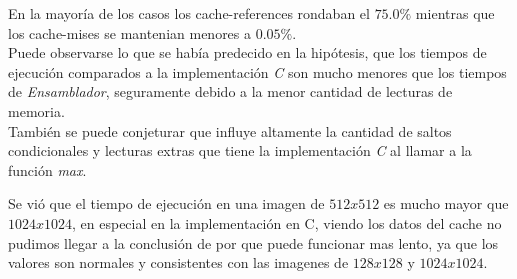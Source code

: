 
En la mayor\'ia de los casos los cache-references rondaban el $75.0\%$ mientras que los cache-mises se mantenian menores a $0.05\%$. \\
Puede observarse lo que se hab\'ia predecido en la hip\'otesis, que los tiempos de ejecuci\'on comparados a la implementaci\'on \emph{C} son mucho menores que los tiempos de \emph{Ensamblador}, seguramente debido a la menor cantidad de lecturas de memoria. \\
Tambi\'en se puede conjeturar que influye altamente la cantidad de saltos condicionales y lecturas extras que tiene la implementaci\'on \emph{C} al llamar a la funci\'on \emph{max}.


Se vi\'o que el tiempo de ejecuci\'on en una imagen de $512x512$ es mucho mayor que $1024x1024$, en especial en la implementaci\'on en C, viendo los datos del cache no pudimos llegar a la conclusi\'on de por que puede funcionar mas lento, ya que los valores son normales y consistentes con las imagenes de $128x128$ y $1024x1024$.

